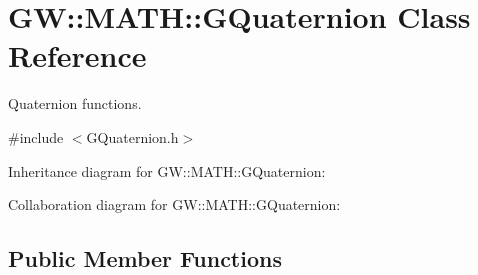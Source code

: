 \hypertarget{classGW_1_1MATH_1_1GQuaternion}{}\section{GW\+:\+:M\+A\+TH\+:\+:G\+Quaternion Class Reference}
\label{classGW_1_1MATH_1_1GQuaternion}


Quaternion functions.  




{\ttfamily \#include $<$G\+Quaternion.\+h$>$}



Inheritance diagram for GW\+:\+:M\+A\+TH\+:\+:G\+Quaternion\+:


Collaboration diagram for GW\+:\+:M\+A\+TH\+:\+:G\+Quaternion\+:
\subsection*{Public Member Functions}
